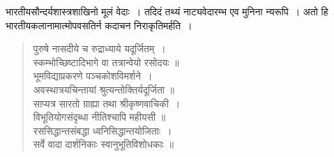 {\dev भारतीयसौन्दर्यशास्त्रशाखिनो मूलं वेदाः~। तदिदं तथ्यं नाट्यवेदारम्भ एव मुनिना न्यरूपि~। अतो हि भारतीयकलानामात्मोपवसतिर्न कदाचन निराकृतिमर्हति~।}
\begin{quote}
{\dev पुरुषे नासदीये च रुद्राध्याये यदूर्जितम्~।}\\
{\dev स्कम्भोच्छिष्टादिभागे वा तत्रान्वेयो रसोदयः ॥}\\[5pt]
{\dev भूमविद्याप्रकरणे पञ्चकोशविमर्शने~।}\\
{\dev अवस्थात्रयचिन्तायां श्रुत्यन्तोक्तिर्यदूर्जिता ॥}\\[5pt]
{\dev साप्यत्र सारतो ग्राह्या तथा श्रीकृष्णवाचिकी~।}\\
{\dev विभूतियोगसंदृब्धा नीतिश्चापि महीयसी ॥}\\[5pt]
{\dev रससिद्धान्तसंबद्धा ध्वनिसिद्धान्तयोजिताः~।}\\
{\dev सर्वे वादा दार्शनिकाः स्वानुभूतिविशोधकाः ॥}
\end{quote}

